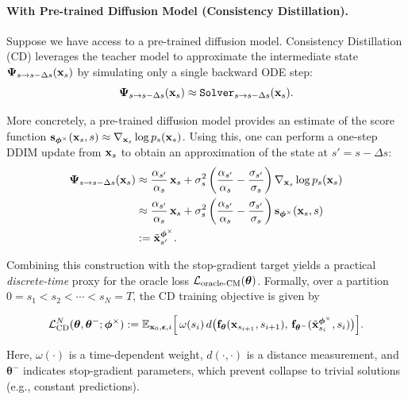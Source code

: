 \paragraph{With Pre-trained Diffusion Model (Consistency Distillation).}
Suppose we have access to a pre-trained diffusion model. 
Consistency Distillation (CD) leverages the teacher model to approximate the intermediate state ${\bm{\Psi}}_{s\to s-\Delta s}({\mathbf{x}}_s)$ by simulating only a single backward ODE step:
\[
 {\bm{\Psi}}_{s\to s-\Delta s}({\mathbf{x}}_s)  \approx  \mathtt{Solver}_{s \to s-\Delta s}({\mathbf{x}}_s).
\]

More concretely, a pre-trained diffusion model provides an estimate of the score function 
${\mathbf{s}}_{\bm{\phi}^\times}({\mathbf{x}}_s, s) \approx \nabla_{{\mathbf{x}}_s}\log p_s({\mathbf{x}}_s)$. 
Using this, one can perform a one-step DDIM update from ${\mathbf{x}}_s$ to obtain an approximation of the state at $s' = s-\Delta s$:
\begin{align*}
    {\bm{\Psi}}_{s\to s-\Delta s}({\mathbf{x}}_s) 
    &\approx \frac{\alpha_{s'}}{\alpha_s}\,{\mathbf{x}}_s 
    + \sigma_s^2 \left( \frac{\alpha_{s'}}{\alpha_s} - \frac{\sigma_{s'}}{\sigma_s} \right)\nabla_{{\mathbf{x}}_s}\log p_s({\mathbf{x}}_s) \\
    &\approx \frac{\alpha_{s'}}{\alpha_s}\,{\mathbf{x}}_s 
    + \sigma_s^2 \left( \frac{\alpha_{s'}}{\alpha_s} - \frac{\sigma_{s'}}{\sigma_s} \right){\mathbf{s}}_{\bm{\phi}^\times}({\mathbf{x}}_s, s) \\
    &:= \tilde{{\mathbf{x}}}_{s'}^{\bm{\phi}^\times}.
\end{align*}

Combining this construction with the stop-gradient target yields a practical \emph{discrete-time} proxy for the oracle loss $\mathcal{L}_{\mathrm{oracle}\text{-}\mathrm{CM}}({\bm{\theta}})$. 
Formally, over a partition $0 = s_1 < s_2 < \cdots < s_N = T$, the CD training objective is given by
\begin{mdframed}
\begin{align}\label{eq:cd-discrete-approx-N}
    \mathcal{L}_{\text{CD}}^N(\bm{\theta}, \bm{\theta}^-; \bm{\phi}^\times) 
    := \mathbb{E}_{{\mathbf{x}}_0, {\bm{\epsilon}}, i} \Big[\, \omega(s_i)\,
    d\big({\mathbf{f}}_{\bm{\theta}}({\mathbf{x}}_{s_{i+1}}, s_{i+1}),\, 
          {\mathbf{f}}_{\bm{\theta}^-}(\tilde{{\mathbf{x}}}_{s_i}^{\bm{\phi}^\times}, s_i)\big)\Big].
\end{align}
\end{mdframed}
Here, $\omega(\cdot)$ is a time-dependent weight, $d(\cdot,\cdot)$ is a distance measurement, and $\bm{\theta}^-$ indicates stop-gradient parameters, which prevent collapse to trivial solutions (e.g., constant predictions).


